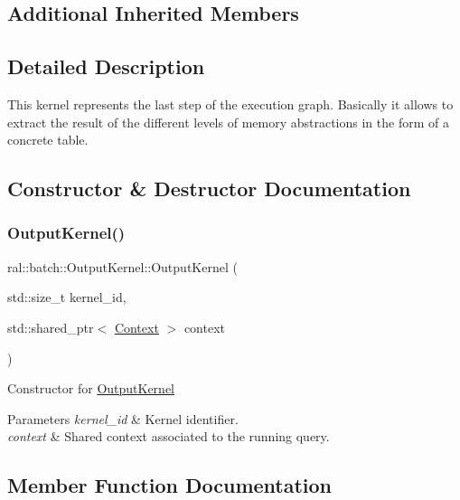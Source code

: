 \subsection*{Additional Inherited Members}


\subsection{Detailed Description}
This kernel represents the last step of the execution graph. Basically it allows to extract the result of the different levels of memory abstractions in the form of a concrete table. 

\subsection{Constructor \& Destructor Documentation}
\mbox{\label{classral_1_1batch_1_1OutputKernel_a549eabea0f9512043cfb21a0ebc38597}} 
\subsubsection{\texorpdfstring{Output\+Kernel()}{OutputKernel()}}
{\footnotesize\ttfamily ral\+::batch\+::\+Output\+Kernel\+::\+Output\+Kernel (\begin{DoxyParamCaption}\item[{std\+::size\+\_\+t}]{kernel\+\_\+id,  }\item[{std\+::shared\+\_\+ptr$<$ \hyperlink{classblazingdb_1_1manager_1_1Context}{Context} $>$}]{context }\end{DoxyParamCaption})\hspace{0.3cm}{\ttfamily [inline]}}

Constructor for \hyperlink{classral_1_1batch_1_1OutputKernel}{Output\+Kernel} 
\begin{DoxyParams}{Parameters}
{\em kernel\+\_\+id} & Kernel identifier. \\
\hline
{\em context} & Shared context associated to the running query. \\
\hline
\end{DoxyParams}


\subsection{Member Function Documentation}
\mbox{\label{classral_1_1batch_1_1OutputKernel_aeab17b971b0dbef6f892561e120b149c}} 
